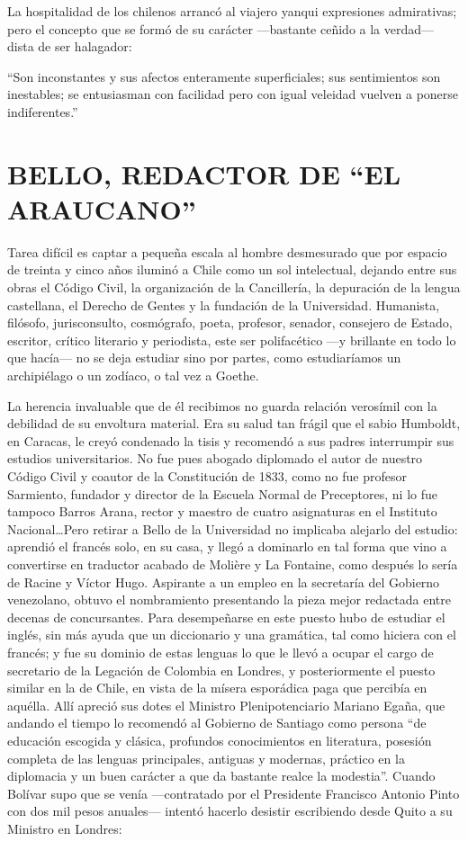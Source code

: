 \documentclass[10pt,twoside,openright]{memoir}
\begin{document}
La hospitalidad de los chilenos arrancó al viajero yanqui expresiones
admirativas; pero el concepto que se formó de su carácter ---bastante
ceñido a la verdad--- dista de ser halagador:

``Son inconstantes y sus afectos enteramente superficiales; sus
sentimientos son inestables; se entusiasman con facilidad pero con igual
veleidad vuelven a ponerse indiferentes.''

\chapter{BELLO, REDACTOR DE ``EL ARAUCANO''}

Tarea difícil es captar a pequeña escala al hombre desmesurado que por
espacio de treinta y cinco años iluminó a Chile como un sol intelectual,
dejando entre sus obras el Código Civil, la organización de la
Cancillería, la depuración de la lengua castellana, el Derecho de Gentes
y la fundación de la Universidad. Humanista, filósofo, jurisconsulto,
cosmógrafo, poeta, profesor, senador, consejero de Estado, escritor,
crítico literario y periodista, este ser polifacético ---y brillante en
todo lo que hacía--- no se deja estudiar sino por partes, como
estudiaríamos un archipiélago o un zodíaco, o tal vez a Goethe.

La herencia invaluable que de él recibimos no guarda relación verosímil
con la debilidad de su envoltura material. Era su salud tan frágil que
el sabio Humboldt, en Caracas, le creyó condenado la tisis y recomendó a
sus padres interrumpir sus estudios universitarios. No fue pues abogado
diplomado el autor de nuestro Código Civil y coautor de la Constitución
de 1833, como no fue profesor Sarmiento, fundador y director de la
Escuela Normal de Preceptores, ni lo fue tampoco Barros Arana, rector y
maestro de cuatro asignaturas en el Instituto Nacional\ldots Pero retirar a
Bello de la Universidad no implicaba alejarlo del estudio: aprendió el
francés solo, en su casa, y llegó a dominarlo en tal forma que vino a
convertirse en traductor acabado de Molière y La Fontaine, como después
lo sería de Racine y Víctor Hugo. Aspirante a un empleo en la secretaría
del Gobierno venezolano, obtuvo el nombramiento presentando la pieza
mejor redactada entre decenas de concursantes. Para desempeñarse en este
puesto hubo de estudiar el inglés, sin más ayuda que un diccionario y
una gramática, tal como hiciera con el francés; y fue su dominio de
estas lenguas lo que le llevó a ocupar el cargo de secretario de la
Legación de Colombia en Londres, y posteriormente el puesto similar en
la de Chile, en vista de la mísera esporádica paga que percibía en
aquélla. Allí apreció sus dotes el Ministro Plenipotenciario Mariano
Egaña, que andando el tiempo lo recomendó al Gobierno de Santiago como
persona ``de educación escogida y clásica, profundos conocimientos en
literatura, posesión completa de las lenguas principales, antiguas y
modernas, práctico en la diplomacia y un buen carácter a que da bastante
realce la modestia''. Cuando Bolívar supo que se venía ---contratado por
el Presidente Francisco Antonio Pinto con dos mil pesos anuales---
intentó hacerlo desistir escribiendo desde Quito a su Ministro en
Londres:
\end{document}
